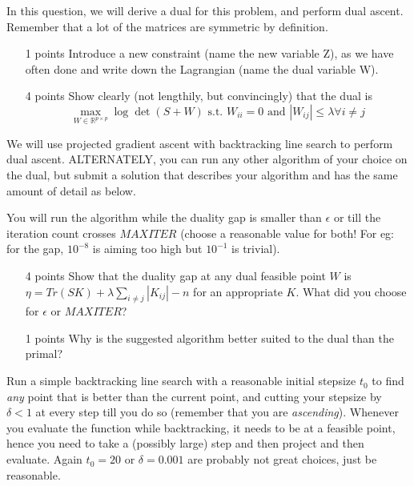  
In this question, we will derive a dual for this problem, and perform dual ascent. Remember that a lot of the matrices are symmetric by definition.

\begin{enumerate}
\item[1 points] Introduce a new constraint (name the new variable Z), as we have often done and write down the Lagrangian (name the dual variable W).

\item[4 points] Show clearly (not lengthily, but convincingly) that the dual is
$$
\max_{W \in \mathbb{R}^{p \times p}} \log \det (S + W) \mbox{ \ \ \ s.t.\ \ \ } W_{ii}=0 \mbox{ and } |W_{ij}| \leq \lambda \forall i \neq j
$$
\end{enumerate}

We will use projected gradient ascent with backtracking line search to perform dual ascent. ALTERNATELY, you can run any other algorithm of your choice on the dual, but submit a solution that describes your algorithm and has the same amount of detail as below.


You will run the algorithm while the duality gap is smaller than $\epsilon$ or till the iteration count crosses $MAXITER$ (choose a reasonable value for both! For eg: for the gap, $10^{-8}$ is aiming too high but $10^{-1}$ is trivial). 

\begin{itemize}
\item [4 points] Show that the duality gap at any dual feasible point $W$ is $\eta = Tr(SK) + \lambda \sum_{i \neq j} |K_{ij}| - n$ for an appropriate $K$. What did you choose for $\epsilon$ or $MAXITER$?

\item [1 points] Why is the suggested algorithm better suited to the dual than the primal? 
\end{itemize}


Run a simple backtracking line search with a reasonable initial stepsize $t_0$ to find \textit{any} point that is better than the current point, and cutting your stepsize by $\delta<1$ at every step till you do so (remember that you are \textit{ascending}). Whenever you evaluate the function while backtracking, it needs to be at a feasible point, hence you need to take a (possibly large) step and then project and then evaluate. Again $t_0=20$ or $\delta=0.001$ are probably not great choices, just be reasonable. 

